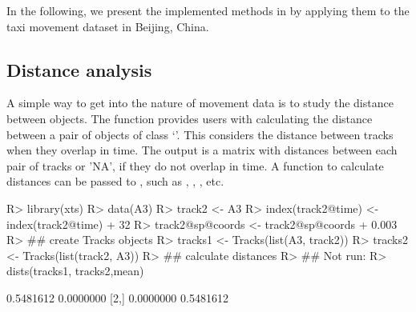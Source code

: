 \documentclass[article]{jss}
\newcommand{\class}[1]{`\code{#1}'}
\begin{document}
  In the following, we present the implemented methods in  by applying them to the taxi movement dataset in Beijing, China. 
\subsection{Distance analysis}\label{distanal}
  A simple way to get into the nature of movement data is to study the distance between objects. The function  provides users with calculating the distance between a pair of objects of class \class{Tracks}. This considers the distance between tracks when they overlap in time. The output is a matrix with distances between each pair of tracks or 'NA', if they do not overlap in time. A function to calculate distances can be passed to , such as , , , etc.

\begin{Schunk}
\begin{Sinput}
R> library(xts)
R> data(A3)
R> track2 <- A3
R> index(track2@time) <- index(track2@time) + 32
R> track2@sp@coords <- track2@sp@coords + 0.003
R> ## create Tracks objects
R> tracks1 <- Tracks(list(A3, track2))
R> tracks2 <- Tracks(list(track2, A3))
R> ## calculate distances
R> ## Not run: 
R> dists(tracks1, tracks2,mean)
\end{Sinput}
\begin{Soutput}
          [,1]      [,2]
[1,] 0.5481612 0.0000000
[2,] 0.0000000 0.5481612
\end{Soutput}
\end{Schunk}
\end{document}
